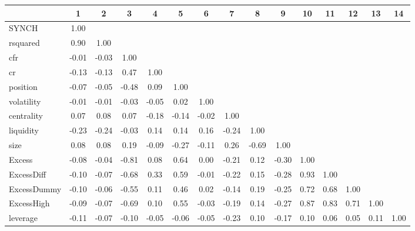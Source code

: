     \begin{tabular}{lcccccccccccccc}
    	\hline\hline
	&1     & 2     & 3     & 4     & 5     & 6     & 7     & 8     & 9     & 10    & 11    & 12    & 13    & 14 \\
	\hline
	SYNCH & 1.00  &       &       &       &       &       &       &       &       &       &       &       &       &  \\
	rsquared & 0.90  & 1.00  &       &       &       &       &       &       &       &       &       &       &       &  \\
	cfr   & -0.01 & -0.03 & 1.00  &       &       &       &       &       &       &       &       &       &       &  \\
	cr    & -0.13 & -0.13 & 0.47  & 1.00  &       &       &       &       &       &       &       &       &       &  \\
	position & -0.07 & -0.05 & -0.48 & 0.09  & 1.00  &       &       &       &       &       &       &       &       &  \\
	volatility & -0.01 & -0.01 & -0.03 & -0.05 & 0.02  & 1.00  &       &       &       &       &       &       &       &  \\
	centrality & 0.07  & 0.08  & 0.07  & -0.18 & -0.14 & -0.02 & 1.00  &       &       &       &       &       &       &  \\
	liquidity & -0.23 & -0.24 & -0.03 & 0.14  & 0.14  & 0.16  & -0.24 & 1.00  &       &       &       &       &       &  \\
	size  & 0.08  & 0.08  & 0.19  & -0.09 & -0.27 & -0.11 & 0.26  & -0.69 & 1.00  &       &       &       &       &  \\
	Excess & -0.08 & -0.04 & -0.81 & 0.08  & 0.64  & 0.00  & -0.21 & 0.12  & -0.30 & 1.00  &       &       &       &  \\
	ExcessDiff & -0.10 & -0.07 & -0.68 & 0.33  & 0.59  & -0.01 & -0.22 & 0.15  & -0.28 & 0.93  & 1.00  &       &       &  \\
	ExcessDummy & -0.10 & -0.06 & -0.55 & 0.11  & 0.46  & 0.02  & -0.14 & 0.19  & -0.25 & 0.72  & 0.68  & 1.00  &       &  \\
	ExcessHigh & -0.09 & -0.07 & -0.69 & 0.10  & 0.55  & -0.03 & -0.19 & 0.14  & -0.27 & 0.87  & 0.83  & 0.71  & 1.00  &  \\
	leverage & -0.11 & -0.07 & -0.10 & -0.05 & -0.06 & -0.05 & -0.23 & 0.10  & -0.17 & 0.10  & 0.06  & 0.05  & 0.11  & 1.00 \\
	\hline\hline
\end{tabular}%